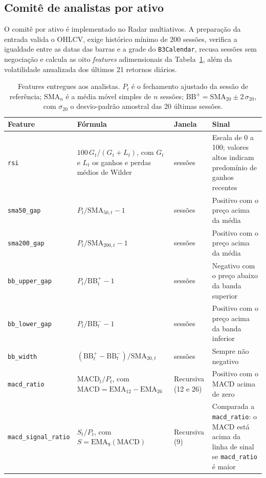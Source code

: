 \subsection{Comitê de analistas por ativo}

O comitê por ativo é implementado no Radar multiativos. A preparação da entrada valida o OHLCV, exige histórico mínimo de 200 sessões, verifica a igualdade entre as datas das barras e a grade do \texttt{B3Calendar}, recusa sessões sem negociação e calcula as oito \textit{features} adimensionais da Tabela~\ref{tab:features}, além da volatilidade anualizada dos últimos 21 retornos diários.

\begin{table}[H]
\centering
\caption{Features entregues aos analistas. $P_t$ é o fechamento ajustado da sessão de referência; $\mathrm{SMA}_n$ é a média móvel simples de $n$ sessões; $\mathrm{BB}^{\pm}=\mathrm{SMA}_{20}\pm 2\,\sigma_{20}$, com $\sigma_{20}$ o desvio-padrão amostral das 20 últimas sessões.}
\label{tab:features}
\small
\setlength{\tabcolsep}{4pt}
\begin{tabular}{>{\raggedright\arraybackslash}p{2.9cm} >{\raggedright\arraybackslash}p{4.4cm} >{\raggedright\arraybackslash}p{2.6cm} >{\raggedright\arraybackslash}p{4.6cm}}
\toprule
\textbf{Feature} & \textbf{Fórmula} & \textbf{Janela} & \textbf{Sinal} \\
\midrule
\texttt{rsi} & $100\,G_t/(G_t+L_t)$, com $G_t$ e $L_t$ os ganhos e perdas médios de Wilder & 14 sessões & Escala de 0 a 100; valores altos indicam predomínio de ganhos recentes \\
\texttt{sma50\_gap} & $P_t/\mathrm{SMA}_{50,t}-1$ & 50 sessões & Positivo com o preço acima da média \\
\texttt{sma200\_gap} & $P_t/\mathrm{SMA}_{200,t}-1$ & 200 sessões & Positivo com o preço acima da média \\
\texttt{bb\_upper\_gap} & $P_t/\mathrm{BB}^{+}_t-1$ & 20 sessões & Negativo com o preço abaixo da banda superior \\
\texttt{bb\_lower\_gap} & $P_t/\mathrm{BB}^{-}_t-1$ & 20 sessões & Positivo com o preço acima da banda inferior \\
\texttt{bb\_width} & $(\mathrm{BB}^{+}_t-\mathrm{BB}^{-}_t)/\mathrm{SMA}_{20,t}$ & 20 sessões & Sempre não negativo \\
\texttt{macd\_ratio} & $\mathrm{MACD}_t/P_t$, com $\mathrm{MACD}=\mathrm{EMA}_{12}-\mathrm{EMA}_{26}$ & Recursiva (12 e 26) & Positivo com o MACD acima de zero \\
\texttt{macd\_signal\_ratio} & $S_t/P_t$, com $S=\mathrm{EMA}_9(\mathrm{MACD})$ & Recursiva (9) & Comparada a \texttt{macd\_ratio}: o MACD está acima da linha de sinal se \texttt{macd\_ratio} é maior \\
\bottomrule
\end{tabular}
\end{table}

